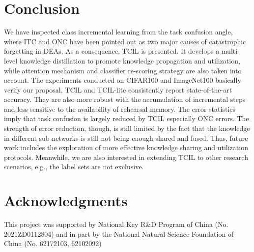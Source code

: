 \documentclass[letterpaper]{article} %
\begin{document}
\section{Conclusion}
We have inspected class incremental learning from the task confusion angle, where ITC and ONC have been pointed out as two major causes of catastrophic forgetting in DEAs. As a consequence, TCIL is presented. It develops a multi-level knowledge distillation to promote knowledge propagation and utilization, while attention mechanism and classifier re-scoring strategy are also taken into account. The experiments conducted on CIFAR100 and ImageNet100 basically verify our proposal. TCIL and TCIL-lite consistently report state-of-the-art accuracy. They are also more robust with the accumulation of incremental steps and less sensitive to the availability of rehearsal memory. The error statistics imply that task confusion is largely reduced by TCIL especially ONC errors. The strength of error reduction, though, is still limited by the fact that the knowledge in different sub-networks is still not being enough shared and fused. Thus, future work includes the exploration of more effective knowledge sharing and utilization protocols. Meanwhile, we are also interested in extending TCIL to other research scenarios, e.g., the label sets are not exclusive.

\section{Acknowledgments}
This project was supported by National Key R\&D Program of China (No. 2021ZD0112804) and in part by the National Natural Science Foundation of China (No. 62172103,  62102092)


\end{document}
